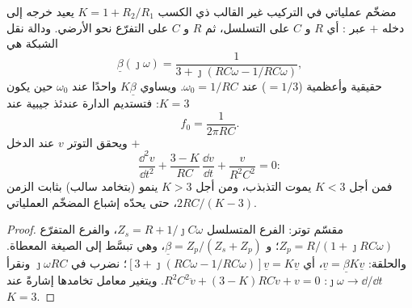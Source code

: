 \begin{proposition}\label{prop:b2:feedback-oscillators:wien}
مضخّم عملياتي في التركيب غير القالب ذي الكسب $K = 1 + R_2/R_1$
يعيد خرجه إلى دخله $+$ عبر \emph{}:
أي $R$ و $C$ على التسلسل، ثم $R$ و $C$ على التفرّع نحو الأرضي. ودالة
نقل الشبكة هي
\[
\underline\beta(\jmath\omega) = \frac1{3 + \jmath(RC\omega - 1/RC\omega)} ,
\]
حقيقية وأعظمية ($= 1/3$) عند $\omega_0 = 1/RC$. ويساوي  $K\underline\beta$
واحدًا عند $\omega_0$ حين يكون $K = 3$: فتستديم الدارة عندئذ
جيبية عند
\[
f_0 = \frac1{2\pi RC} .
\]
ويحقق التوتر $v$ عند الدخل $+$
\[
\frac{\dd^2v}{\dd t^2} + \frac{3 - K}{RC}\,\frac{\dd v}{\dd t} + \frac{v}{R^2C^2} = 0 :
\]
فمن أجل $K < 3$ يموت التذبذب، ومن أجل $K > 3$ ينمو (بتخامد
سالب) بثابت الزمن $2RC/(K - 3)$، حتى يحدّه إشباع المضخّم
العملياتي.
\end{proposition}

\begin{proof}
مقسّم توتر: الفرع المتسلسل $Z_s = R + 1/\jmath C\omega$، والفرع
المتفرّع $Z_p = R/(1 + \jmath RC\omega)$؛ و $\underline\beta = Z_p/(Z_s + Z_p)$، وهي
تبسَّط إلى الصيغة المعطاة. والحلقة: $\underline v = \underline\beta K\underline v$، أي
$[3 + \jmath(RC\omega - 1/RC\omega)]\underline v = K\underline v$؛ نضرب في $\jmath\omega RC$
ونقرأ $\jmath\omega \to \dd/\dd t$: $R^2C^2\ddot v + (3 - K)RC\dot v + v = 0$.
ويتغير معامل تخامدها إشارةً عند $K = 3$.
\end{proof}

